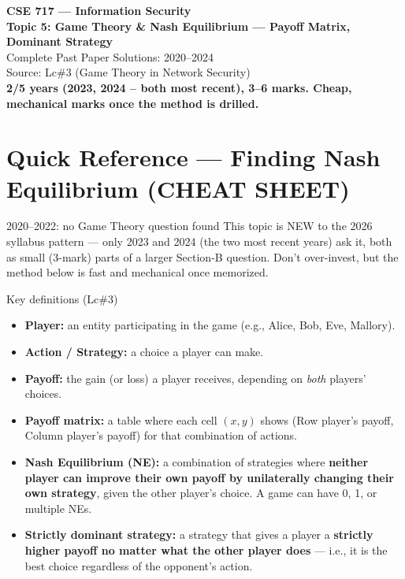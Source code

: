 \documentclass[12pt,a4paper]{article}
\begin{document}
\begin{center}
{\LARGE\bfseries\color{folblue} CSE 717 --- Information Security}\\[4pt]
{\large\bfseries Topic 5: Game Theory \& Nash Equilibrium --- Payoff Matrix, Dominant Strategy}\\[2pt]
{\large Complete Past Paper Solutions: 2020--2024}\\[6pt]
{\normalsize Source: Lc\#3 (Game Theory in Network Security)}\\[2pt]
{\normalsize\color{darkred}\textbf{2/5 years (2023, 2024 -- both most recent), 3--6 marks. Cheap, mechanical marks once the method is drilled.}}
\end{center}

\tableofcontents

\section*{Quick Reference --- Finding Nash Equilibrium (CHEAT SHEET)}

\begin{warnbox}{2020--2022: no Game Theory question found}
This topic is NEW to the 2026 syllabus pattern --- only 2023 and 2024 (the two most recent years) ask it, both as small (3-mark) parts of a larger Section-B question. Don't over-invest, but the method below is fast and mechanical once memorized.
\end{warnbox}

\begin{algobox}{Key definitions (Lc\#3)}
\begin{itemize}[noitemsep]
  \item \textbf{Player:} an entity participating in the game (e.g., Alice, Bob, Eve, Mallory).
  \item \textbf{Action / Strategy:} a choice a player can make.
  \item \textbf{Payoff:} the gain (or loss) a player receives, depending on \emph{both} players' choices.
  \item \textbf{Payoff matrix:} a table where each cell $(x,y)$ shows (Row player's payoff, Column player's payoff) for that combination of actions.
  \item \textbf{Nash Equilibrium (NE):} a combination of strategies where \textbf{neither player can improve their own payoff by unilaterally changing their own strategy}, given the other player's choice. A game can have 0, 1, or multiple NEs.
  \item \textbf{Strictly dominant strategy:} a strategy that gives a player a \textbf{strictly higher payoff no matter what the other player does} --- i.e., it is the best choice regardless of the opponent's action.
\end{itemize}
\end{algobox}
\end{document}
